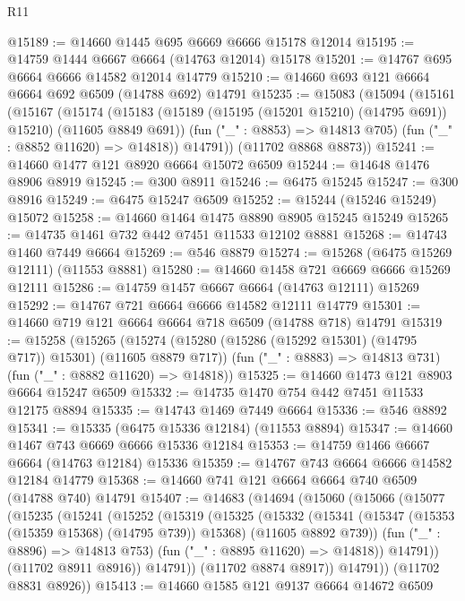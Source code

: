 \begin{lexlean}{R11}
\begin{coremodule}
{{{{{{{{{{{{{{{{{{{{{{{{{{{{{{{{{{{{{{{{{{{{{{{{{{{{{{{{{{{{{{{{{{{{{{{{{{{{{{{{{{@15189 := @14660 @1445 @695 @6669 @6666 @15178 @12014
@15195 := @14759 @1444 @6667 @6664 (@14763 @12014) @15178
@15201 := @14767 @695 @6664 @6666 @14582 @12014 @14779
@15210 := @14660 @693 @121 @6664 @6664 @692 @6509 (@14788 @692) @14791
@15235 := @15083
    (@15094
      (@15161
        (@15167
          (@15174
            (@15183 (@15189 (@15195 (@15201 @15210) (@14795 @691)) @15210) (@11605 @8849 @691))
            (fun ("_" : @8853) => @14813 @705)
            (fun ("_" : @8852 @11620) => @14818))
          @14791))
      (@11702 @8868 @8873))
@15241 := @14660 @1477 @121 @8920 @6664 @15072 @6509
@15244 := @14648 @1476 @8906 @8919
@15245 := @300 @8911
@15246 := @6475 @15245
@15247 := @300 @8916
@15249 := @6475 @15247 @6509
@15252 := @15244 (@15246 @15249) @15072
@15258 := @14660 @1464 @1475 @8890 @8905 @15245 @15249
@15265 := @14735 @1461 @732 @442 @7451 @11533 @12102 @8881
@15268 := @14743 @1460 @7449 @6664
@15269 := @546 @8879
@15274 := @15268 (@6475 @15269 @12111) (@11553 @8881)
@15280 := @14660 @1458 @721 @6669 @6666 @15269 @12111
@15286 := @14759 @1457 @6667 @6664 (@14763 @12111) @15269
@15292 := @14767 @721 @6664 @6666 @14582 @12111 @14779
@15301 := @14660 @719 @121 @6664 @6664 @718 @6509 (@14788 @718) @14791
@15319 := @15258
    (@15265
      (@15274 (@15280 (@15286 (@15292 @15301) (@14795 @717)) @15301) (@11605 @8879 @717))
      (fun ("_" : @8883) => @14813 @731)
      (fun ("_" : @8882 @11620) => @14818))
@15325 := @14660 @1473 @121 @8903 @6664 @15247 @6509
@15332 := @14735 @1470 @754 @442 @7451 @11533 @12175 @8894
@15335 := @14743 @1469 @7449 @6664
@15336 := @546 @8892
@15341 := @15335 (@6475 @15336 @12184) (@11553 @8894)
@15347 := @14660 @1467 @743 @6669 @6666 @15336 @12184
@15353 := @14759 @1466 @6667 @6664 (@14763 @12184) @15336
@15359 := @14767 @743 @6664 @6666 @14582 @12184 @14779
@15368 := @14660 @741 @121 @6664 @6664 @740 @6509 (@14788 @740) @14791
@15407 := @14683
    (@14694
      (@15060
        (@15066
          (@15077
            (@15235
              (@15241
                (@15252
                  (@15319
                    (@15325
                      (@15332
                        (@15341
                          (@15347 (@15353 (@15359 @15368) (@14795 @739)) @15368)
                          (@11605 @8892 @739))
                        (fun ("_" : @8896) => @14813 @753)
                        (fun ("_" : @8895 @11620) => @14818))
                      @14791))
                  (@11702 @8911 @8916))
                @14791))
            (@11702 @8874 @8917))
          @14791))
      (@11702 @8831 @8926))
@15413 := @14660 @1585 @121 @9137 @6664 @14672 @6509
}}}}}}}}}}}}}}}}}}}}}}}}}}}}}}}}}}}}}}}}}}}}}}}}}}}}}}}}}}}}}}}}}}}}}}}}}}}}}}}}}}
\end{coremodule}
\end{lexlean}
